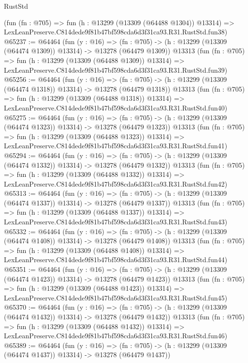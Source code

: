 \begin{lexlean}{RustStd}
\begin{coremodule}
    (fun (fn : @705) =>
    fun (h : @13299 (@13309 (@64488 @1304)) @13314) =>
    LexLeanPreserve.C814dede9f81b47bf598cda6d3f31ca93.R31.RustStd.fun38)
@65237 := @64464
    (fun (y : @16) =>
    (fn : @705) -> (h : @13299 (@13309 (@64474 @1309)) @13314) -> @13278 (@64479 @1309))
    @13313
    (fun (fn : @705) =>
    fun (h : @13299 (@13309 (@64488 @1309)) @13314) =>
    LexLeanPreserve.C814dede9f81b47bf598cda6d3f31ca93.R31.RustStd.fun39)
@65256 := @64464
    (fun (y : @16) =>
    (fn : @705) -> (h : @13299 (@13309 (@64474 @1318)) @13314) -> @13278 (@64479 @1318))
    @13313
    (fun (fn : @705) =>
    fun (h : @13299 (@13309 (@64488 @1318)) @13314) =>
    LexLeanPreserve.C814dede9f81b47bf598cda6d3f31ca93.R31.RustStd.fun40)
@65275 := @64464
    (fun (y : @16) =>
    (fn : @705) -> (h : @13299 (@13309 (@64474 @1323)) @13314) -> @13278 (@64479 @1323))
    @13313
    (fun (fn : @705) =>
    fun (h : @13299 (@13309 (@64488 @1323)) @13314) =>
    LexLeanPreserve.C814dede9f81b47bf598cda6d3f31ca93.R31.RustStd.fun41)
@65294 := @64464
    (fun (y : @16) =>
    (fn : @705) -> (h : @13299 (@13309 (@64474 @1332)) @13314) -> @13278 (@64479 @1332))
    @13313
    (fun (fn : @705) =>
    fun (h : @13299 (@13309 (@64488 @1332)) @13314) =>
    LexLeanPreserve.C814dede9f81b47bf598cda6d3f31ca93.R31.RustStd.fun42)
@65313 := @64464
    (fun (y : @16) =>
    (fn : @705) -> (h : @13299 (@13309 (@64474 @1337)) @13314) -> @13278 (@64479 @1337))
    @13313
    (fun (fn : @705) =>
    fun (h : @13299 (@13309 (@64488 @1337)) @13314) =>
    LexLeanPreserve.C814dede9f81b47bf598cda6d3f31ca93.R31.RustStd.fun43)
@65332 := @64464
    (fun (y : @16) =>
    (fn : @705) -> (h : @13299 (@13309 (@64474 @1408)) @13314) -> @13278 (@64479 @1408))
    @13313
    (fun (fn : @705) =>
    fun (h : @13299 (@13309 (@64488 @1408)) @13314) =>
    LexLeanPreserve.C814dede9f81b47bf598cda6d3f31ca93.R31.RustStd.fun44)
@65351 := @64464
    (fun (y : @16) =>
    (fn : @705) -> (h : @13299 (@13309 (@64474 @1423)) @13314) -> @13278 (@64479 @1423))
    @13313
    (fun (fn : @705) =>
    fun (h : @13299 (@13309 (@64488 @1423)) @13314) =>
    LexLeanPreserve.C814dede9f81b47bf598cda6d3f31ca93.R31.RustStd.fun45)
@65370 := @64464
    (fun (y : @16) =>
    (fn : @705) -> (h : @13299 (@13309 (@64474 @1432)) @13314) -> @13278 (@64479 @1432))
    @13313
    (fun (fn : @705) =>
    fun (h : @13299 (@13309 (@64488 @1432)) @13314) =>
    LexLeanPreserve.C814dede9f81b47bf598cda6d3f31ca93.R31.RustStd.fun46)
@65389 := @64464
    (fun (y : @16) =>
    (fn : @705) -> (h : @13299 (@13309 (@64474 @1437)) @13314) -> @13278 (@64479 @1437))

\end{coremodule}
\end{lexlean}
